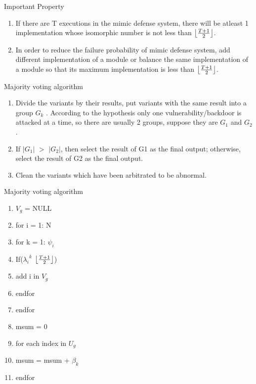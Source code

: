 \documentclass{beamer}
\DeclarePairedDelimiter\floor{\lfloor}{\rfloor}
\begin{document}
\begin{frame}{Important Property}
    \begin{block}{}
        \begin{enumerate}
            \item If there are T executions in the mimic defense system, there will be atleast 1 implementation whose isomorphic number is not less than $\floor*{\frac{T+1}{2}}$.
            \item In order to reduce the failure probability of mimic defense system, add different implementation of a module or balance the same implementation of a module so that its maximum implementation is less than $\floor*{\frac{T+1}{2}}$.
        \end{enumerate}
    \end{block}
 \end{frame}
\begin{frame}{Majority voting algorithm}
    \begin{block}{}
        \begin{enumerate}
            \item Divide the variants by their results, put variants with the same result into a group $G_k$ . According to the hypothesis only one vulnerability/backdoor is attacked at a time, so there are usually 2 groups, suppose they are $G_1$ and $G_2$.
            \item If $\lvert G_1 \rvert$ $>$ $\lvert G_2 \rvert$, then select the result of G1 as the final output; otherwise, select the result of G2 as the final output.
            \item Clean the variants which have been arbitrated to be abnormal.
        \end{enumerate}
    \end{block}
\end{frame}
\begin{frame}{Majority voting algorithm}
    \begin{block}{}
        \begin{enumerate}
            \item $V_g$ = NULL
            \item for i = 1: N
            \item for k = 1: $\psi_i$
            \item If(${\lambda_i}^k$ \geq\:$\floor*{\frac{T+1}{2}}$)
            \item add i in $V_g$
            \item endfor
            \item endfor
            \item msum = 0
            \item for each index in $U_g$
            \item msum = msum + $\beta_k$
            \item endfor
        \end{enumerate}
    \end{block}
\end{frame}
\end{document}
